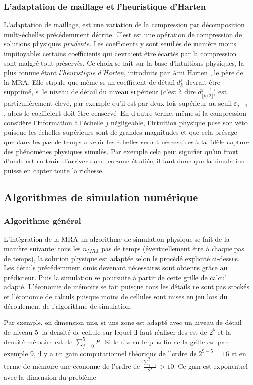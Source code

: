     \subsubsection{L'adaptation de maillage et l'heuristique d'Harten}
            L'adaptation de maillage, est une variation de la compression par décomposition multi-échelles précédemment décrite. 
            C'est est une opération de compression de solutions physiques \textit{prudente}.
            Les coefficients y sont seuillés de manière moins impitoyable: certains coefficients qui devraient être écartés
            par la compression sont malgré tout préservés. Ce choix se fait sur la base d'intuitions physiques, 
            la plus connue étant \textit{l'heuristique d'Harten}, introduite par Ami Harten \cite{harten1994}, le père de la MRA.
            Elle stipule que même si un coefficient de détail $d_k^j$ devrait être supprimé, si le niveau de détail du niveau supérieur 
            (c'est à dire $d^{j-1}_{\lfloor k/2 \rfloor}$) est particulièrement élevé, par exemple qu'il est par deux fois supérieur au seuil $\varepsilon_{j-1}$,
            alors le coefficient doit être conservé. En d'autre terme, même si la compression considère l'information à l'échelle $j$ négligeable,
            l'intuition physique pose son véto puisque les échelles supérieurs sont de grandes magnitudes et que cela présage que dans 
            les pas de temps a venir les échelles seront nécessaires à la fidèle capture des phénomènes physiques simulés. Par exemple cela peut signifier qu'un front
            d'onde est en train d'arriver dans les zone étudiée, il faut donc que la simulation puisse en capter toute la richesse.
\subsection{Algorithmes de simulation numérique}
    \subsubsection{Algorithme général}
            L'intégration de la MRA un algorithme de simulation physique se fait de la manière suivante: 
            tous les $n_{MRA}$ pas de temps (éventuellement être à chaque pas de temps), 
            la solution physique est adaptée selon le procédé explicité ci-dessus. Les détails précédemment omis
            devenant nécessaires sont obtenus grâce au prédicteur. Puis la simulation se poursuite à partir de cette grille de calcul adapté.
            L'économie de mémoire se fait puisque tous les détails ne sont pas stockés et l'économie de calculs puisque moins de cellules sont mises en 
            jeu lors du déroulement de l’algorithme de simulation.\par
            Par exemple, en dimension une, si une zone est adapté avec un niveau de détail de niveau 5, la densité de cellule sur lequel il faut réaliser des est de $2^5$
            et la densité mémoire est de $\sum_{j=0}^5 2^j$. Si le niveau le plus fin de la grille est par exemple 9, il y a un gain computationnel théorique de l'ordre de 
            $2^{9-5}=16$ et en terme de mémoire une économie de l'ordre de $\frac{\sum_{j=0}^5}{2^8} > 10$. Ce gain est exponentiel avec la dimension du problème.
